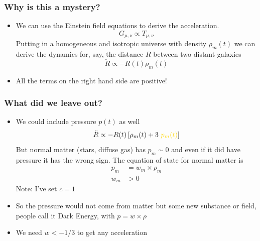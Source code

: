 \documentclass{beamer}
\newcommand{\gdarkenergy}{{\color{cadetblue} Dark Energy}}
\begin{document}
\frame
{
    \frametitle{Why is this a mystery?}

    \begin{itemize}
        \item We can use the Einstein field equations to derive the
            acceleration.
            \begin{equation}
                G_{\mu, \nu} \propto T_{\mu, \nu}
            \end{equation}
            Putting in a homogeneous and isotropic universe with
            density $\rho_m(t)$ we can
            derive the dynamics for, say, the distance $R$ between
            two distant galaxies
            \begin{equation}
                \ddot{R} \propto - R(t) \rho_m(t)
            \end{equation}

        \item All the terms on the right hand side are positive!
    \end{itemize}
}

\frame
{
    \frametitle{What did we leave out?}

    \begin{itemize}
        \item We could include pressure {\color{gold} $p(t)$} as well
            \begin{equation}
                \ddot{R} \propto - R(t) \left[\rho_m(t) + 3~ {\color{gold} p_m(t)}\right]
            \end{equation}
            But normal matter (stars, diffuse gas) has $p_m \sim 0$
            and even if it did have pressure it has the wrong sign.  The equation
            of state for normal matter is
            \begin{align}
                p_m &= w_m \times \rho_m \\
                w_m & > 0
            \end{align}
            Note: I've set $c = 1$

        \item So the pressure would not come from matter but some new substance or field, 
            people call it \gdarkenergy, with $p = w \times \rho$

        \item We need $w < -1/3$ to get any acceleration

    \end{itemize}
}
\end{document}
